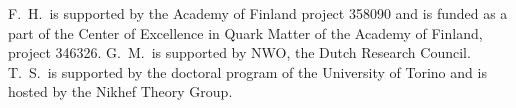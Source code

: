 
F.~H.\ is supported by the Academy of Finland
project 358090 and is funded as a part of the Center
of Excellence in Quark Matter of the Academy of Finland, project 346326.
G.~M.\ is supported by NWO, the Dutch Research Council.
T.~S.\ is supported by the doctoral program of the University of Torino and
is hosted by the Nikhef Theory Group.

